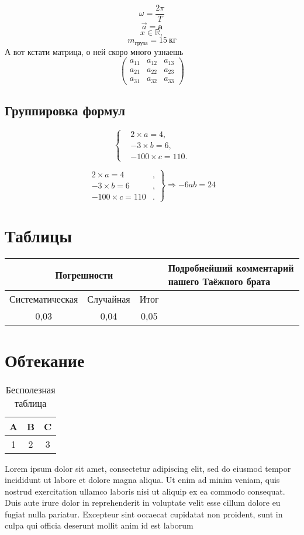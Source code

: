 \documentclass[12pt]{article}
\begin{document}
\[\omega = \frac{2\pi}{T}\]
\[\overrightarrow{a} = \mathbf{a}\]
\[x\in \mathbb{R},\]
\[m_{\text{груза}}=15~\text{кг}\]
А вот кстати матрица, о ней скоро много узнаешь
\[\begin{pmatrix}
a_{11} & a_{12} & a_{13}\\
a_{21} & a_{22} & a_{23}\\
a_{31} & a_{32} & a_{33}
\end{pmatrix}\]

\subsection{Группировка формул}

\begin{equation}
\left\{
\begin{aligned}
&2\times a=4,\\
&-3\times b=6,\\
&-100\times c=110.
\end{aligned} \right.
\end{equation}

\[
\left.
\begin{aligned}
2\times a=4&,\\
-3\times b=6&,\\
-100\times c=110&.
\end{aligned} \right\} \Rightarrow -6ab = 24
\]

\section{Таблицы}

\begin{tabular}{|c|c|c|p{5cm}|}
\hline 
\multicolumn{3}{|c|}{Погрешности} & Подробнейший комментарий нашего Таёжного брата \\ 
\hline 
Систематическая & Случайная & Итог &\\ 
\hline 
0,03 & 0,04 & 0,05 & \\ 
\hline 
\end{tabular} 

\section{Обтекание}

\begin{wraptable}{r}{5cm}
\begin{tabular}{|c|c|c|}
\hline 
A & B & C \\ 
\hline 
1 & 2 & 3 \\ 
\hline 
\end{tabular} 
\caption{Бесполезная таблица}
\end{wraptable}
Lorem ipsum dolor sit amet, consectetur adipiscing elit, sed do eiusmod tempor incididunt ut labore et dolore magna aliqua. Ut enim ad minim veniam, quis nostrud exercitation ullamco laboris nisi ut aliquip ex ea commodo consequat. Duis aute irure dolor in reprehenderit in voluptate velit esse cillum dolore eu fugiat nulla pariatur. Excepteur sint occaecat cupidatat non proident, sunt in culpa qui officia deserunt mollit anim id est laborum
\end{document}
